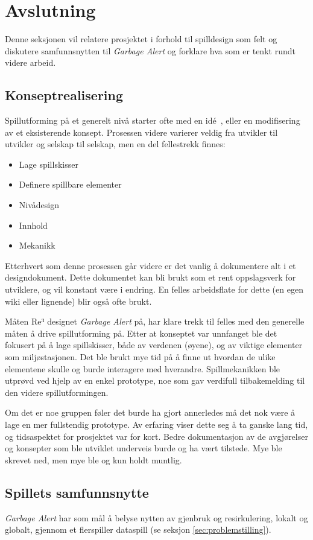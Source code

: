 \section{Avslutning}\label{sec:conclusion}
Denne seksjonen vil relatere prosjektet i forhold til spilldesign som
felt og diskutere samfunnsnytten til \emph{Garbage Alert} og forklare hva som er tenkt
rundt videre arbeid.

\subsection{Konseptrealisering}
Spillutforming på et generelt nivå starter ofte med en idé~\cite{bates},
eller en modifisering av et eksisterende konsept. Prosessen videre
varierer veldig fra utvikler til utvikler og selskap til selskap, men en
del fellestrekk finnes:
\begin{itemize}
\item Lage spillskisser
\item Definere spillbare elementer
\item Nivådesign
\item Innhold
\item Mekanikk
\end{itemize}
Etterhvert som denne prosessen går videre er det vanlig å dokumentere
alt i et designdokument. Dette dokumentet kan bli brukt som et rent
oppslagsverk for utviklere, og vil konstant være i endring. En felles
arbeidsflate for dette (en egen wiki eller lignende) blir også ofte brukt.

Måten Re³ designet \emph{Garbage Alert} på, har klare trekk til felles med den generelle
måten å drive spillutforming på. Etter at konseptet var unnfanget ble
det fokusert på å lage spillskisser, både av verdenen (øyene), og av
viktige elementer som miljøstasjonen. Det ble brukt mye tid på å finne
ut hvordan de ulike elementene skulle og burde interagere med hverandre.
Spillmekanikken ble utprøvd ved hjelp av en enkel prototype, noe som gav
verdifull tilbakemelding til den videre spillutformingen.

Om det er noe gruppen føler det burde ha gjort annerledes må det nok
være å lage en mer fullstendig prototype. Av erfaring viser dette seg å
ta ganske lang tid, og tidsaspektet for prosjektet var for kort. Bedre dokumentasjon av de avgjørelser og konsepter som ble utviklet underveis burde og ha vært tilstede. Mye ble skrevet ned, men mye ble og kun holdt muntlig.

\subsection{Spillets samfunnsnytte}
\emph{Garbage Alert} har som mål å belyse nytten av gjenbruk og resirkulering, lokalt og globalt, gjennom et flerspiller dataspill (se seksjon \ref{sec:problemstilling}).

